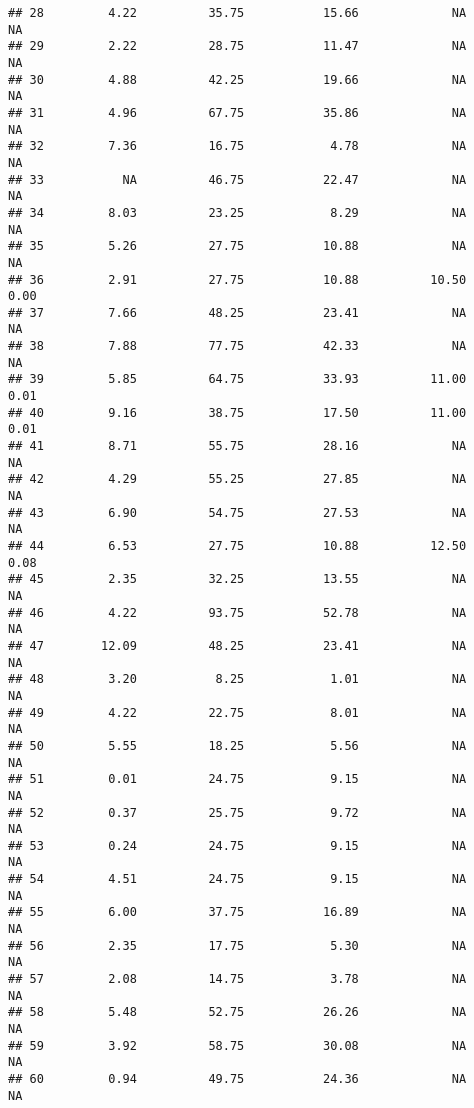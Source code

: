 \documentclass[]{article}
\begin{document}
\begin{verbatim}
## 28         4.22          35.75           15.66             NA              NA
## 29         2.22          28.75           11.47             NA              NA
## 30         4.88          42.25           19.66             NA              NA
## 31         4.96          67.75           35.86             NA              NA
## 32         7.36          16.75            4.78             NA              NA
## 33           NA          46.75           22.47             NA              NA
## 34         8.03          23.25            8.29             NA              NA
## 35         5.26          27.75           10.88             NA              NA
## 36         2.91          27.75           10.88          10.50            0.00
## 37         7.66          48.25           23.41             NA              NA
## 38         7.88          77.75           42.33             NA              NA
## 39         5.85          64.75           33.93          11.00            0.01
## 40         9.16          38.75           17.50          11.00            0.01
## 41         8.71          55.75           28.16             NA              NA
## 42         4.29          55.25           27.85             NA              NA
## 43         6.90          54.75           27.53             NA              NA
## 44         6.53          27.75           10.88          12.50            0.08
## 45         2.35          32.25           13.55             NA              NA
## 46         4.22          93.75           52.78             NA              NA
## 47        12.09          48.25           23.41             NA              NA
## 48         3.20           8.25            1.01             NA              NA
## 49         4.22          22.75            8.01             NA              NA
## 50         5.55          18.25            5.56             NA              NA
## 51         0.01          24.75            9.15             NA              NA
## 52         0.37          25.75            9.72             NA              NA
## 53         0.24          24.75            9.15             NA              NA
## 54         4.51          24.75            9.15             NA              NA
## 55         6.00          37.75           16.89             NA              NA
## 56         2.35          17.75            5.30             NA              NA
## 57         2.08          14.75            3.78             NA              NA
## 58         5.48          52.75           26.26             NA              NA
## 59         3.92          58.75           30.08             NA              NA
## 60         0.94          49.75           24.36             NA              NA

\end{verbatim}
\end{document}
